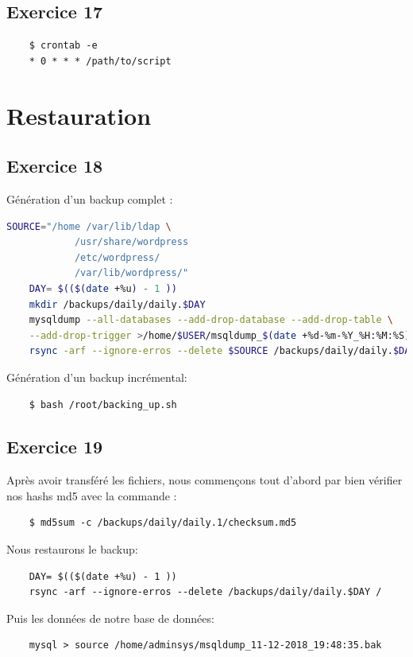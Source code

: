 \documentclass{report}
\begin{document}
\subsection{Exercice 17}
\begin{tcolorbox}
  \begin{verbatim}
    $ crontab -e
    * 0 * * * /path/to/script
  \end{verbatim}
\end{tcolorbox}
\section{Restauration}
\subsection{Exercice 18}
Génération d'un backup complet :
\begin{tcolorbox}
\begin{lstlisting}[language=bash]
    SOURCE="/home /var/lib/ldap \
            /usr/share/wordpress
            /etc/wordpress/
            /var/lib/wordpress/"
    DAY= $(($(date +%u) - 1 ))
    mkdir /backups/daily/daily.$DAY
    mysqldump --all-databases --add-drop-database --add-drop-table \
    --add-drop-trigger >/home/$USER/msqldump_$(date +%d-%m-%Y_%H:%M:%S).bak
    rsync -arf --ignore-erros --delete $SOURCE /backups/daily/daily.$DAY
\end{lstlisting}
\end{tcolorbox}
Génération d'un backup incrémental:
\begin{tcolorbox}
  \begin{verbatim}
    $ bash /root/backing_up.sh
  \end{verbatim}
\end{tcolorbox}
\subsection{Exercice 19}
Après avoir transféré les fichiers, nous commençons tout d'abord par bien vérifier
nos hashs md5 avec la commande :
\begin{tcolorbox}
  \begin{verbatim}
    $ md5sum -c /backups/daily/daily.1/checksum.md5
  \end{verbatim}
\end{tcolorbox}
Nous restaurons le backup:
\begin{tcolorbox}
  \begin{verbatim}
    DAY= $(($(date +%u) - 1 ))
    rsync -arf --ignore-erros --delete /backups/daily/daily.$DAY /
  \end{verbatim}
\end{tcolorbox}
Puis les données de notre base de données:
\begin{tcolorbox}
  \begin{verbatim}
    mysql > source /home/adminsys/msqldump_11-12-2018_19:48:35.bak
  \end{verbatim}
\end{tcolorbox}
\end{document}
